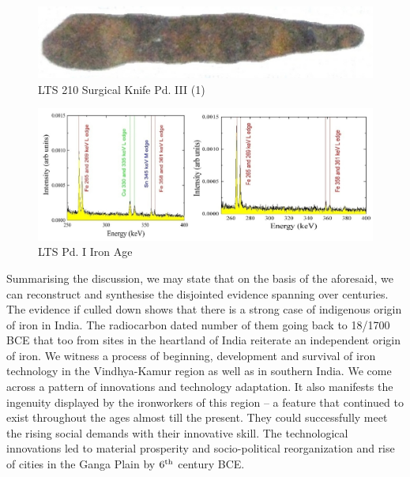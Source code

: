 \begin{figure}[H]
\renewcommand{\thefigure}{7A}
\includegraphics[scale=.5]{images/chapter-3/fig007a.jpg}
\caption{LTS 210 Surgical Knife Pd. III (1)}\label{chapter-3-fig7A}
\end{figure}

\begin{figure}[H]
\renewcommand{\thefigure}{7B}
\includegraphics[scale=0.22]{images/chapter-3/fig007b.jpg}
\caption{LTS Pd. I Iron Age}\label{chapter-3-fig7B}
\end{figure}

Summarising the discussion, we may state that on the basis of the aforesaid, we can reconstruct and synthesise the disjointed evidence spanning over centuries. The evidence if culled down shows that there is a strong case of indigenous origin of iron in India. The radiocarbon dated number of them going back to 18/1700 BCE that too from sites in the heartland of India reiterate an independent origin of iron. We witness a process of beginning, development and survival of iron technology in the Vindhya-Kamur region as well as in southern India. We come across a pattern of innovations and technology adaptation. It also manifests the ingenuity displayed by the ironworkers of this region – a feature that continued to exist throughout the ages almost till the present. They could successfully meet the rising social demands with their innovative skill. The technological innovations led to material prosperity and socio-political reorganization and rise of cities in the Ganga Plain by $6^{\rm th}$ century BCE. 

